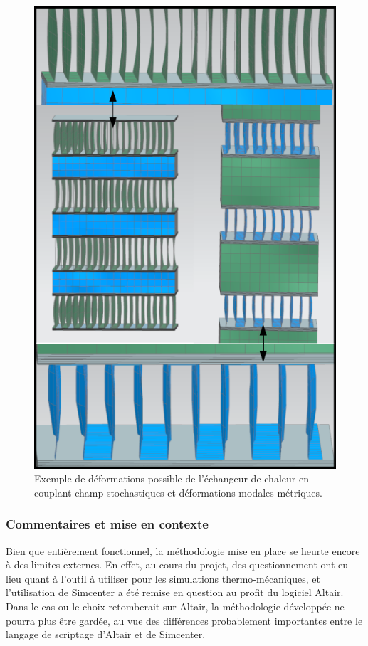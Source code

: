 \documentclass[a4paper,10pt]{article}
\begin{document}
\begin{figure}[H]
   \centering   
   \includegraphics[scale=0.5]{./exchangerPics/exchangerDeformations.png}
      \caption{Exemple de déformations possible de l'échangeur de chaleur en couplant champ stochastiques et déformations modales métriques. }
         \label{deformationsExchanger}
\end{figure}

\subsubsection{Commentaires et mise en contexte}

Bien que entièrement fonctionnel, la méthodologie mise en place se heurte encore à des limites externes. En effet, au cours du projet, des questionnement ont eu lieu quant à l'outil à utiliser pour les simulations thermo-mécaniques, et l'utilisation de Simcenter a été remise en question au profit du logiciel Altair.\\ 
Dans le cas ou le choix retomberait sur Altair, la méthodologie développée ne pourra plus être gardée, au vue des différences probablement importantes entre le langage de scriptage d'Altair et de Simcenter.\\ 
 
\end{document}

